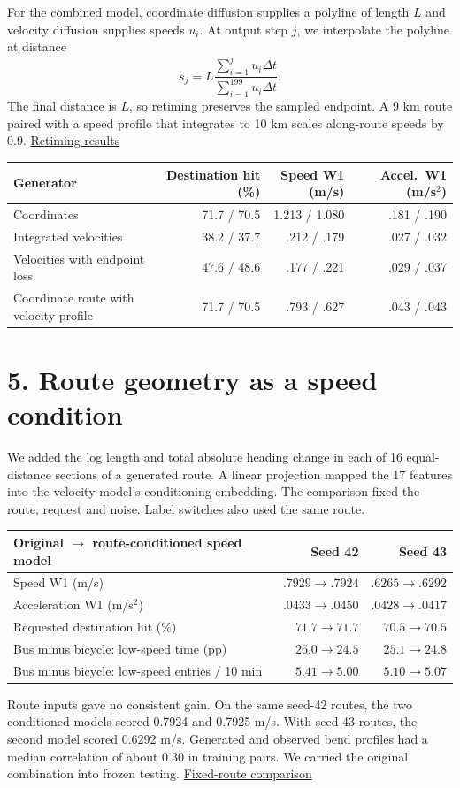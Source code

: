 \documentclass[11pt,a4paper]{article}
\newcommand{\record}[2]{\href{https://github.com/LiuJingting0201/cnr-road-gaf-diffusion/blob/main/docs/results/#1}{#2}}
\begin{document}
For the combined model, coordinate diffusion supplies a polyline of length $L$ and velocity diffusion supplies speeds $u_i$. At output step $j$, we interpolate the polyline at distance
\[
s_j=L\frac{\sum_{i=1}^j u_i\Delta t}{\sum_{i=1}^{199}u_i\Delta t}.
\]
The final distance is $L$, so retiming preserves the sampled endpoint. A 9 km route paired with a speed profile that integrates to 10 km scales along-route speeds by 0.9. \record{velocity-retiming/README.md}{Retiming results}
\begin{center}\small
\begin{tabular}{lrrr}\toprule
Generator & Destination hit (\%) & Speed W1 (m/s) & Accel.\ W1 (m/s$^2$)\\\midrule
Coordinates & 71.7 / 70.5 & 1.213 / 1.080 & .181 / .190\\
Integrated velocities & 38.2 / 37.7 & .212 / .179 & .027 / .032\\
Velocities with endpoint loss & 47.6 / 48.6 & .177 / .221 & .029 / .037\\
Coordinate route with velocity profile & 71.7 / 70.5 & .793 / .627 & .043 / .043\\\bottomrule
\end{tabular}\end{center}

\section*{5. Route geometry as a speed condition}
We added the log length and total absolute heading change in each of 16 equal-distance sections of a generated route. A linear projection mapped the 17 features into the velocity model's conditioning embedding. The comparison fixed the route, request and noise. Label switches also used the same route.
\begin{center}\small
\begin{tabular}{lrr}\toprule
Original $\rightarrow$ route-conditioned speed model & Seed 42 & Seed 43\\\midrule
Speed W1 (m/s) & $.7929\rightarrow.7924$ & $.6265\rightarrow.6292$\\
Acceleration W1 (m/s$^2$) & $.0433\rightarrow.0450$ & $.0428\rightarrow.0417$\\
Requested destination hit (\%) & $71.7\rightarrow71.7$ & $70.5\rightarrow70.5$\\
Bus minus bicycle: low-speed time (pp) & $26.0\rightarrow24.5$ & $25.1\rightarrow24.8$\\
Bus minus bicycle: low-speed entries / 10 min & $5.41\rightarrow5.00$ & $5.10\rightarrow5.07$\\\bottomrule
\end{tabular}\end{center}
Route inputs gave no consistent gain. On the same seed-42 routes, the two conditioned models scored 0.7924 and 0.7925 m/s. With seed-43 routes, the second model scored 0.6292 m/s. Generated and observed bend profiles had a median correlation of about 0.30 in training pairs. We carried the original combination into frozen testing. \record{route-conditioned-clock/RESULTS.md}{Fixed-route comparison}
\end{document}
